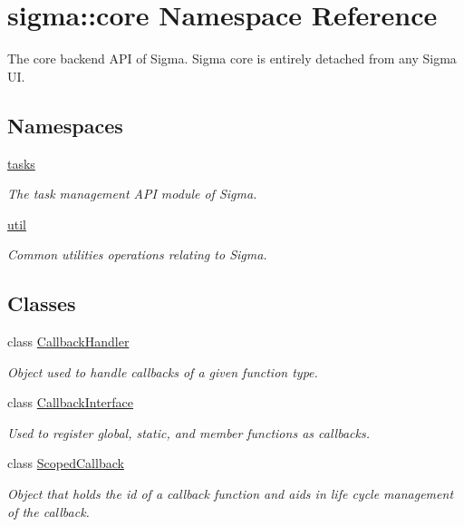 \hypertarget{namespacesigma_1_1core}{}\section{sigma\+:\+:core Namespace Reference}
\label{namespacesigma_1_1core}


The core backend A\+P\+I of Sigma. Sigma core is entirely detached from any Sigma U\+I.  


\subsection*{Namespaces}
\begin{DoxyCompactItemize}
\item 
 \hyperlink{namespacesigma_1_1core_1_1tasks}{tasks}
\begin{DoxyCompactList}\small\item\em The task management A\+P\+I module of Sigma. \end{DoxyCompactList}\item 
 \hyperlink{namespacesigma_1_1core_1_1util}{util}
\begin{DoxyCompactList}\small\item\em Common utilities operations relating to Sigma. \end{DoxyCompactList}\end{DoxyCompactItemize}
\subsection*{Classes}
\begin{DoxyCompactItemize}
\item 
class \hyperlink{classsigma_1_1core_1_1_callback_handler}{Callback\+Handler}
\begin{DoxyCompactList}\small\item\em Object used to handle callbacks of a given function type. \end{DoxyCompactList}\item 
class \hyperlink{classsigma_1_1core_1_1_callback_interface}{Callback\+Interface}
\begin{DoxyCompactList}\small\item\em Used to register global, static, and member functions as callbacks. \end{DoxyCompactList}\item 
class \hyperlink{classsigma_1_1core_1_1_scoped_callback}{Scoped\+Callback}
\begin{DoxyCompactList}\small\item\em Object that holds the id of a callback function and aids in life cycle management of the callback. \end{DoxyCompactList}\end{DoxyCompactItemize}
